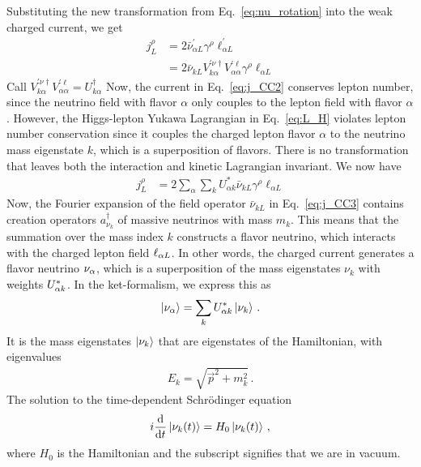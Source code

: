 \documentclass[draft=True]{revtex4-2}
\begin{document}
Substituting the new transformation from Eq.~\ref{eq:nu_rotation} into the weak charged current, we get
\begin{align}\label{eq:j_CC2}
    j^\rho_L &= 2\bar{\nu}^\prime_{\alpha L} \gamma^\rho \ell_{\alpha L}^\prime \nonumber \\
             &= 2\bar{\nu}_{k L} V^{\prime \nu \dagger}_{k \alpha}V^{\prime \ell}_{\alpha \alpha} \gamma^\rho  \ell_{\alpha L}
\end{align}
Call $V^{\prime \nu \dagger}_{k \alpha}V^{\prime \ell}_{\alpha \alpha} = U^\dagger_{k \alpha}$
Now, the current in Eq.~\ref{eq:j_CC2} conserves lepton number, since the neutrino field with flavor $\alpha$ only couples to the lepton field with flavor $\alpha$. However, the Higgs-lepton Yukawa Lagrangian 
in Eq.~\ref{eq:L_H} violates lepton number conservation since it couples the charged lepton flavor $\alpha$ to the neutrino mass eigenstate $k$, which is a superposition of flavors. There is no transformation that leaves both the interaction and kinetic Lagrangian invariant.
We now have 
\begin{align}\label{eq:j_CC3} %
    j^\rho_L &= 2 \sum_\alpha \sum_k U^*_{\alpha k} \bar{\nu}_{k L} \gamma^\rho  \ell_{\alpha L}
\end{align}
Now, the Fourier expansion of the field operator $\bar{\nu}_{k L}$ in Eq.~\ref{eq:j_CC3} contains creation operators $a^\dagger_{\nu_k}$
of massive neutrinos with mass $m_k$. This means that the summation over the mass index $k$ constructs a flavor neutrino, which interacts with the charged lepton field $\ell_{\alpha L}$.
In other words, the charged current generates a flavor neutrino $\nu_\alpha$, which is a superposition of the mass eigenstates 
$\nu_k$ with weights $U_{\alpha k}^*$. In the ket-formalism, we express this as
\begin{align}\label{eq:osc_1}
    \ket{\nu_\alpha} = \sum_k U^*_{\alpha k} \ket{\nu_k}\,.
\end{align}
It is the mass eigenstates $\ket{\nu_k}$ that are eigenstates of the Hamiltonian, with eigenvalues
\begin{align}\label{eq:disp}
    E_k = \sqrt{\vec{p}^2 + m_k^2}\,.
\end{align}
The solution to the time-dependent Schrödinger equation 
\begin{align}\label{eq:TDSE}
    i \dv{}{t} \ket{\nu_k(t)} = H_0\ket{\nu_k(t)}\,,
\end{align}
where $H_0$ is the Hamiltonian and the subscript signifies that we are in vacuum. 
\end{document}
